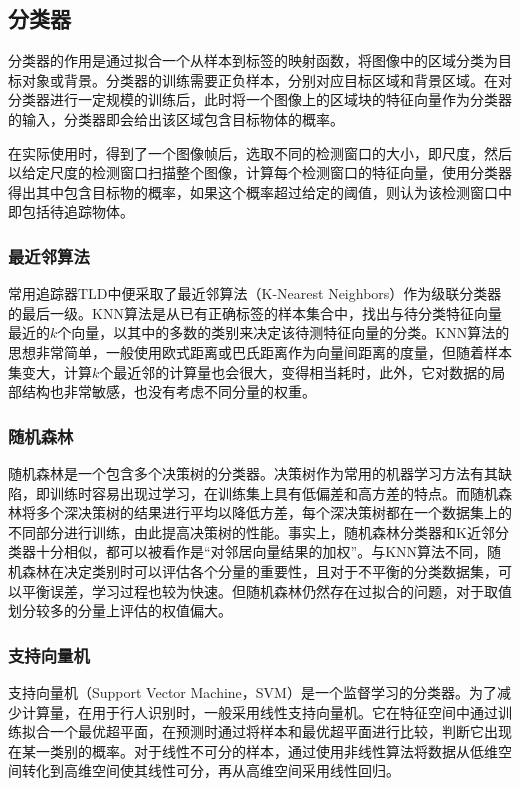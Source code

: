 \subsection{分类器}

  分类器的作用是通过拟合一个从样本到标签的映射函数，将图像中的区域分类为目标对象或背景。分类器的训练需要正负样本，分别对应目标区域和背景区域。在对分类器进行一定规模的训练后，此时将一个图像上的区域块的特征向量作为分类器的输入，分类器即会给出该区域包含目标物体的概率。

  在实际使用时，得到了一个图像帧后，选取不同的检测窗口的大小，即尺度，然后以给定尺度的检测窗口扫描整个图像，计算每个检测窗口的特征向量，使用分类器得出其中包含目标物的概率，如果这个概率超过给定的阈值，则认为该检测窗口中即包括待追踪物体。

\subsubsection{最近邻算法}
  常用追踪器TLD中便采取了最近邻算法（K-Nearest Neighbors）作为级联分类器的最后一级。KNN算法是从已有正确标签的样本集合中，找出与待分类特征向量最近的$k$个向量，以其中的多数的类别来决定该待测特征向量的分类。KNN算法的思想非常简单，一般使用欧式距离或巴氏距离作为向量间距离的度量，但随着样本集变大，计算$k$个最近邻的计算量也会很大，变得相当耗时，此外，它对数据的局部结构也非常敏感，也没有考虑不同分量的权重。

\subsubsection{随机森林}
  随机森林是一个包含多个决策树的分类器。决策树作为常用的机器学习方法有其缺陷，即训练时容易出现过学习，在训练集上具有低偏差和高方差的特点。而随机森林将多个深决策树的结果进行平均以降低方差，每个深决策树都在一个数据集上的不同部分进行训练，由此提高决策树的性能。事实上，随机森林分类器和K近邻分类器十分相似，都可以被看作是“对邻居向量结果的加权”。与KNN算法不同，随机森林在决定类别时可以评估各个分量的重要性，且对于不平衡的分类数据集，可以平衡误差，学习过程也较为快速。但随机森林仍然存在过拟合的问题，对于取值划分较多的分量上评估的权值偏大。

\subsubsection{支持向量机}

  支持向量机（Support Vector Machine，SVM）是一个监督学习的分类器。为了减少计算量，在用于行人识别时，一般采用线性支持向量机。它在特征空间中通过训练拟合一个最优超平面，在预测时通过将样本和最优超平面进行比较，判断它出现在某一类别的概率。对于线性不可分的样本，通过使用非线性算法将数据从低维空间转化到高维空间使其线性可分，再从高维空间采用线性回归。

